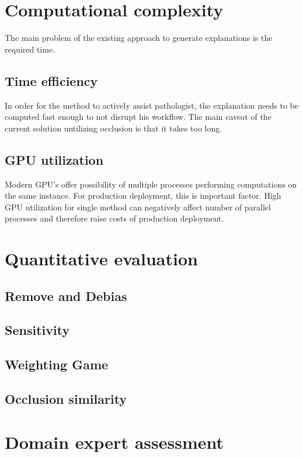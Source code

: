 
\section{Computational complexity}

The main problem of the existing approach to generate explanations is the required time.

\subsection*{Time efficiency}

In order for the method to actively assist pathologist, the explanation needs to be computed fast enough to not disrupt his workflow. The main caveat of the current solution untilizing occlusion is that it takes too long.

\subsection*{GPU utilization}

Modern GPU's offer possibility of multiple processes performing computations on the same instance. For production deployment, this is important factor. High GPU utilization for single method can negatively affect number of parallel processes and therefore raise costs of production deployment.

\section{Quantitative evaluation}

\subsection*{Remove and Debias}

\subsection*{Sensitivity}

\subsection*{Weighting Game}

\subsection*{Occlusion similarity}

\section{Domain expert assessment}
